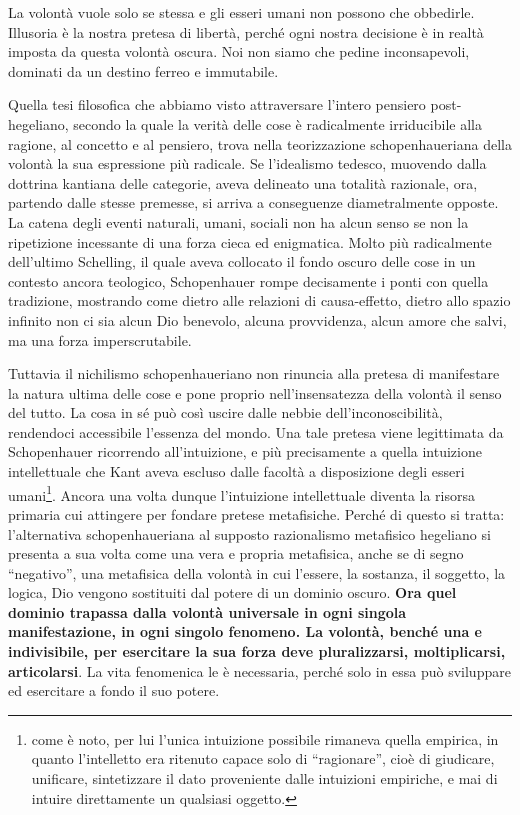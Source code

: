 La volontà vuole solo se stessa e gli esseri umani non possono che obbedirle. Illusoria è la nostra pretesa di libertà, perché ogni nostra decisione è in realtà imposta da questa volontà oscura. Noi non siamo che pedine inconsapevoli, dominati da un destino ferreo e immutabile.

Quella tesi filosofica che abbiamo visto attraversare l’intero pensiero post-hegeliano, secondo la quale la verità delle cose è radicalmente irriducibile alla ragione, al concetto e al pensiero, trova nella teorizzazione schopenhaueriana della volontà la sua espressione più radicale. Se l’idealismo tedesco, muovendo dalla dottrina kantiana delle categorie, aveva delineato una totalità razionale, ora, partendo dalle stesse premesse, si arriva a conseguenze diametralmente opposte. La catena degli eventi naturali, umani, sociali non ha alcun senso se non la ripetizione incessante di una forza cieca ed enigmatica.
Molto più radicalmente dell’ultimo Schelling, il quale aveva collocato il fondo oscuro delle cose in un contesto ancora teologico, Schopenhauer rompe decisamente i ponti con quella tradizione, mostrando come dietro alle relazioni di causa-effetto, dietro allo spazio infinito non ci sia alcun Dio benevolo, alcuna provvidenza, alcun amore che salvi, ma una forza imperscrutabile. 

Tuttavia il nichilismo schopenhaueriano non rinuncia alla pretesa di manifestare la natura ultima delle cose e pone proprio nell’insensatezza della volontà il senso del tutto. La cosa in sé può così uscire dalle nebbie dell’inconoscibilità, rendendoci accessibile l’essenza del mondo. Una tale pretesa viene legittimata da Schopenhauer ricorrendo all’intuizione, e più precisamente a quella intuizione intellettuale che Kant aveva escluso dalle facoltà a disposizione degli esseri umani\footnote{come è noto, per lui l’unica intuizione possibile rimaneva quella empirica, in quanto l’intelletto era ritenuto capace solo di “ragionare”, cioè di giudicare, unificare, sintetizzare il dato proveniente dalle intuizioni empiriche, e mai di intuire direttamente un qualsiasi oggetto.}.
Ancora una volta dunque l’intuizione intellettuale diventa la risorsa primaria cui attingere per fondare pretese metafisiche. Perché di questo si tratta: l’alternativa schopenhaueriana al supposto razionalismo metafisico hegeliano si presenta a sua volta come una vera e propria metafisica, anche se di segno “negativo”, una metafisica della volontà in cui l’essere, la sostanza, il soggetto, la logica, Dio vengono sostituiti dal potere di un dominio oscuro. \textbf{Ora quel dominio trapassa dalla volontà universale in ogni singola manifestazione, in ogni singolo fenomeno. La volontà, benché una e indivisibile, per esercitare la sua forza deve pluralizzarsi, moltiplicarsi, articolarsi}. La vita fenomenica le è necessaria, perché solo in essa può sviluppare ed esercitare a fondo il suo potere. 

